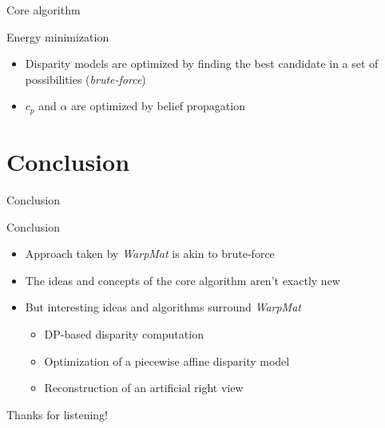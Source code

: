 \documentclass[12pt]{beamer}
\begin{document}
\begin{frame}{Core algorithm}
  \begin{block}{Energy minimization}
    \begin{itemize}
      \item Disparity models are optimized by finding the best candidate in a set of possibilities (\emph{brute-force})
      \item $c_p$ and $\alpha$ are optimized by belief propagation
    \end{itemize}
  \end{block}
\end{frame}

\section{Conclusion}

\begin{frame}{Conclusion}
  \begin{block}{Conclusion}
    \begin{itemize}
      \item Approach taken by \emph{WarpMat} is akin to brute-force
      \item The ideas and concepts of the core algorithm aren't exactly new
      \item But interesting ideas and algorithms surround \emph{WarpMat}
        \begin{itemize}
          \item DP-based disparity computation
          \item Optimization of a piecewise affine disparity model
          \item Reconstruction of an artificial right view
        \end{itemize}
    \end{itemize}
  \end{block}
\end{frame}

\begin{frame}
  \begin{center} \large Thanks for listening! \end{center}
\end{frame}
\end{document}
